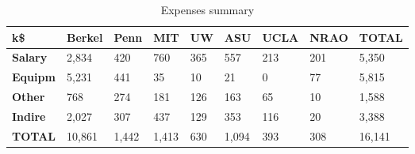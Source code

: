 

\begin{table}[h]
\centering
\caption{Expenses summary}
\label{tab:expenses}
\begin{tabular}{| p{0.5in} | p{.6in} |  p{.6in} |  p{.6in} |  p{.6in} |  p{.6in} |  p{.6in} |  p{.6in} |  p{.6in} | }\hline
  k\$   & \textbf{Berkel} & \textbf{Penn} & \textbf{MIT} & \textbf{UW} & \textbf{ASU} & \textbf{UCLA} & \textbf{NRAO} & \textbf{TOTAL}\\\hline
\textbf{Salary}&       2,834  &         420  &         760  &         365  &         557  &         213  &         201  &       5,350  \\\hline
\textbf{Equipm}&       5,231  &         441  &          35  &          10  &          21  &           0  &          77  &       5,815  \\\hline
\textbf{Other}&         768  &         274  &         181  &         126  &         163  &          65  &          10  &       1,588  \\\hline
\textbf{Indire}&       2,027  &         307  &         437  &         129  &         353  &         116  &          20  &       3,388  \\\hline
\textbf{TOTAL}&      10,861  &       1,442  &       1,413  &         630  &       1,094  &         393  &         308  &      16,141  \\\hline
\end{tabular}
\end{table}
